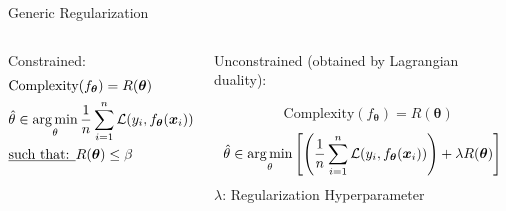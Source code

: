 \documentclass[aspectratio=169]{../latex_main/tntbeamer}  %
\begin{document}
	\begin{frame}{Generic Regularization}
	    
	    \begin{columns}
	            
	            \begin{column}{0.5\textwidth}
	                
	                Constrained:
	                	    \begin{align*}
                    	        &\text{Complexity}(f_{\bm{\theta}}) = R(\bm{\theta})\\
                    	        &\hat{\theta} \in \operatorname*{arg\,min}_{\theta} \frac{1}{n}\sum_{i=1}^n\mathcal{L}(y_i,f_{\bm{\theta}}(\bm{x}_i))\\
                    	        &\underline{\text{such that: }} R(\bm{\theta}) \leq \beta
                    	    \end{align*}
	                
	            \end{column}
	            
	            \begin{column}{0.5\textwidth}
	            
	                Unconstrained (obtained by Lagrangian duality):
	                
	                	    \begin{align*}
	        &\text{Complexity}(f_{\bm{\theta}}) = R(\bm{\theta})
	    \end{align*}
	    \begin{equation*}
	        \hat{\theta} \in \operatorname*{arg\,min}_{\theta}\left[ \left(\frac{1}{n}\sum_{i=1}^n\mathcal{L}(y_i,f_{\bm{\theta}}(\bm{x}_i)) \right) + \lambda R(\bm{\theta})\right]
	    \end{equation*}
        $\lambda$: Regularization Hyperparameter
	                
	                
	            \end{column}
	            
	    \end{columns}

	\end{frame}
	
	
	
\end{document}
